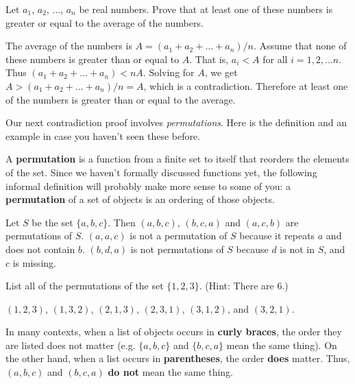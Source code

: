 \begin{exa}
Let $a_1$, $a_2$, $\ldots$, $a_n$ be real numbers.
Prove that at least one of these numbers is greater or equal to
the average of the numbers.
\begin{pf}
The average of the numbers is
$A=(a_1+a_2+ \ldots + a_n)/n$.
Assume that none of these numbers is greater than or equal to $A$.  That is, 
$a_i<A$ for all $i=1,2,\ldots n$.  Thus
$(a_1+a_2+ \ldots + a_n)<n A$. Solving for $A$, we get
$A > (a_1+a_2+ \ldots + a_n)/n=A$, which is a contradiction.
Therefore at least one of the numbers is greater than or equal to the average.
\end{pf}
\end{exa}



Our next contradiction proof involves {\em permutations}.  Here is the definition and an example
in case you haven't seen these before.

\begin{df}
A {\bf permutation} is a function from a finite set to itself that
reorders the elements of the set. 
Since we haven't formally discussed functions yet, the
following informal definition will probably make more sense
to some of you:
a {\bf permutation} of a set of objects is an
ordering of those objects.
\end{df}

\vspace*{-.1in}

\begin{exa}
Let $S$ be the set $\{a, b, c\}$.
Then $(a, b, c)$, $(b, c, a)$ and $(a,c,b)$ are permutations of $S$.
$(a, a, c)$ is not a permutation of $S$ because it repeats $a$ and does not contain $b$.
$(b, d, a)$ is not permutations of $S$ because $d$ is not in $S$, and $c$ is missing.
\end{exa}

\vspace*{-.1in}

\begin{exer}
List all of the permutations of the set $\{1, 2, 3\}$. (Hint:  There are 6.)\\
\answerlinetwo
\begin{answer}
$(1,2,3)$, $(1,3,2)$, $(2,1,3)$, $(2,3,1)$, $(3,1,2)$, and $(3,2,1)$.
\end{answer}
\end{exer}

\begin{rem}
In many contexts, when a list of objects occurs in {\bf curly braces},
the order they are listed does not matter (e.g. $\{a, b, c\}$ and $\{b, c, a\}$ mean the same thing).  
On the other hand, when a list occurs in
{\bf parentheses}, the order {\bf does} matter.
Thus, $(a, b, c)$ and $(b, c, a)$ {\bf do not} mean the same thing. 
\end{rem}

